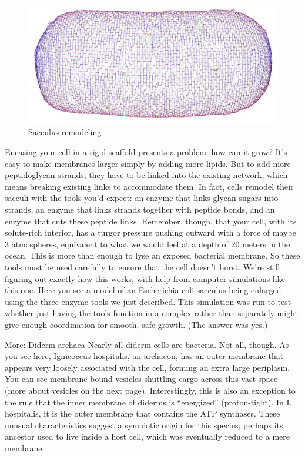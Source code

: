 \documentclass[]{tufte-book}
\begin{document}
\hypertarget{htmlwidget-55acbd6db6c66142a387}{}

\begin{figure}
\includegraphics{img/02_schematic/2_3_2_SacculusRemodeling} \caption[Sacculus remodeling]{Sacculus remodeling}\label{fig:2-3-2}
\end{figure}

Encasing your cell in a rigid scaffold presents a problem: how can it grow? It's easy to make membranes larger simply by adding more lipids. But to add more peptidoglycan strands, they have to be linked into the existing network, which means breaking existing links to accommodate them. In fact, cells remodel their sacculi with the tools you'd expect: an enzyme that links glycan sugars into strands, an enzyme that links strands together with peptide bonds, and an enzyme that cuts these peptide links. Remember, though, that your cell, with its solute-rich interior, has a turgor pressure pushing outward with a force of maybe 3 atmospheres, equivalent to what we would feel at a depth of 20 meters in the ocean. This is more than enough to lyse an exposed bacterial membrane. So these tools must be used carefully to ensure that the cell doesn't burst. We're still figuring out exactly how this works, with help from computer simulations like this one. Here you see a model of an Escherichia coli sacculus being enlarged using the three enzyme tools we just described. This simulation was run to test whether just having the tools function in a complex rather than separately might give enough coordination for smooth, safe growth. (The answer was yes.)

More: Diderm archaea
Nearly all diderm cells are bacteria. Not all, though. As you see here, Ignicoccus hospitalis, an archaeon, has an outer membrane that appears very loosely associated with the cell, forming an extra large periplasm. You can see membrane-bound vesicles shuttling cargo across this vast space (more about vesicles on the next page). Interestingly, this is also an exception to the rule that the inner membrane of diderms is ``energized'' (proton-tight). In I. hospitalis, it is the outer membrane that contains the ATP synthases. These unusual characteristics suggest a symbiotic origin for this species; perhaps its ancestor used to live inside a host cell, which was eventually reduced to a mere membrane.
\end{document}
